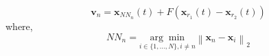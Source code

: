 \begin{equation}
\mathbf{v}_{n}=\mathbf{x}_{N N_{n}}(t)+F\left(\mathbf{x}_{r_{1}}(t)-\mathbf{x}_{r_{2}}(t)\right)
\label{fNRNAD1_equation}
\end{equation}
where,
$$N N_{n}=\underset{i \in\{1, \ldots, N\}, i \neq n} {\arg \min} \left\|\mathbf{x}_{n}-\mathbf{x}_{i}\right\|_{2}$$

